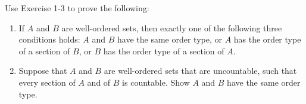 \documentclass[a4paper,12pt]{article}
\begin{document}
\begin{exe}
	Use Exercise 1-3 to prove the following: 
	\begin{enumerate}
		\item
		      If \( A \) and \( B \) are well-ordered sets, then exactly one of the following three conditions holds:
		      \( A \) and \( B \) have the same order type, or \( A \) has the order type of a section of \( B \),
		      or \( B \) has the order type of a section of \( A \).
		      
		\item
		      Suppose that \( A \) and \( B \) are well-ordered sets that are uncountable,
		      such that every section of \( A \) and of \( B \) is countable.
		      Show \( A \) and \( B \) have the same order type.
	\end{enumerate}
\end{exe}
\end{document}

